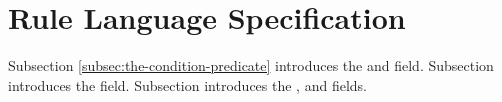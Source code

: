 \chapter{Rule Language Specification}\label{ch:rule-language-specification}

Subsection \ref{subsec:the-condition-predicate} introduces the  and   field.
Subsection \addref introduces the  field.
Subsection \addref introduces the ,  and  fields.




